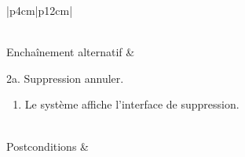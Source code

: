 \begin{longtable}{|p{4cm}|p{12cm}|}
\begin{minipage}[t]{\linewidth}
\begin{enumerate}[itemindent=0pt, leftmargin=*, nosep,after=\vspace{-\baselineskip},before=\vspace{-0.5\baselineskip}]
                    \end{enumerate}
                    \end{minipage}
                     \\
                    \hline
                    Enchaînement alternatif &  
                    \begin{minipage}[t]{\linewidth}
                        2a. Suppression annuler. \begin{enumerate}[nosep,after=\strut]
                              \item Le système affiche l'interface de suppression.
                        \end{enumerate}
                    \end{minipage}
                    \\
                    
                    \hline
                    Postconditions &   \\
                    \hline
                    \caption{Description du cas d'utilisation « Supprimer membre »}\\
            \end{longtable}            
            
